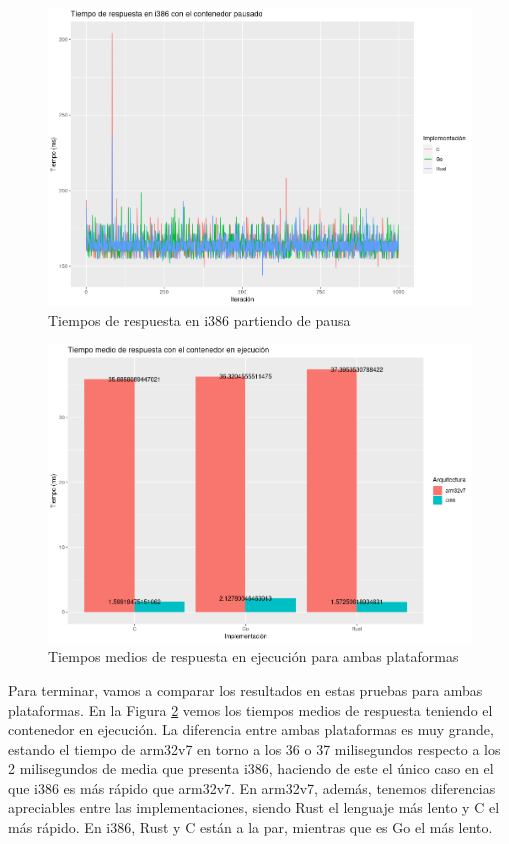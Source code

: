 \begin{figure}
    \centering
    \includegraphics[width=\textwidth]{images/response-time/i386-paused.png}
    \caption{Tiempos de respuesta en i386 partiendo de pausa}
    \label{fig:response-time-i386-paused}
\end{figure}

\begin{figure}
    \centering
    \includegraphics[width=\textwidth]{images/response-time/mean-running.png}
    \caption{Tiempos medios de respuesta en ejecución para ambas plataformas}
    \label{fig:response-time-mean-running}
\end{figure}

\newpage

Para terminar, vamos a comparar los resultados en estas pruebas para ambas
plataformas. En la Figura \ref{fig:response-time-mean-running} vemos los tiempos
medios de respuesta teniendo el contenedor en ejecución. La diferencia entre
ambas plataformas es muy grande, estando el tiempo de arm32v7 en torno a los 36
o 37 milisegundos respecto a los 2 milisegundos de media que presenta i386,
haciendo de este el único caso en el que i386 es más rápido que arm32v7. En
arm32v7, además, tenemos diferencias apreciables entre las implementaciones,
siendo Rust el lenguaje más lento y C el más rápido. En i386, Rust y C están a
la par, mientras que es Go el más lento.

